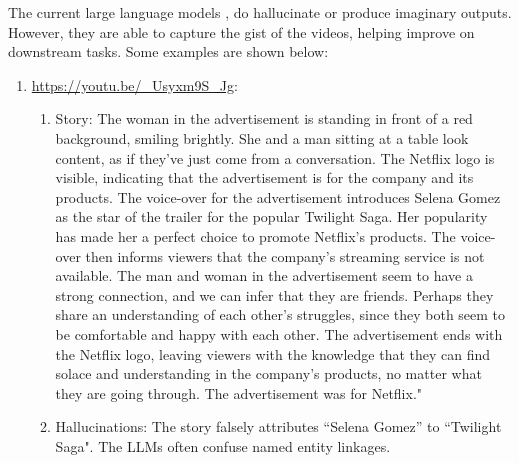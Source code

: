 \documentclass[hidelinks,11pt,a4paper]{report}
\begin{document}
The current large language models , do hallucinate or produce imaginary outputs. However, they are able to capture the gist of the videos, helping improve on downstream tasks. Some examples are shown below:

\begin{enumerate}
    \item \url{https://youtu.be/_Usyxm9S_Jg}:
    \begin{enumerate}
        \item Story: The woman in the advertisement is standing in front of a red background, smiling brightly. She and a man sitting at a table look content, as if they've just come from a conversation. The Netflix logo is visible, indicating that the advertisement is for the company and its products. The voice-over for the advertisement introduces Selena Gomez as the star of the trailer for the popular Twilight Saga. Her popularity has made her a perfect choice to promote Netflix's products. The voice-over then informs viewers that the company's streaming service is not available. The man and woman in the advertisement seem to have a strong connection, and we can infer that they are friends. Perhaps they share an understanding of each other's struggles, since they both seem to be comfortable and happy with each other. The advertisement ends with the Netflix logo, leaving viewers with the knowledge that they can find solace and understanding in the company's products, no matter what they are going through. The advertisement was for Netflix."

        \item Hallucinations: The story falsely attributes ``Selena Gomez'' to ``Twilight Saga". The LLMs often confuse named entity linkages.
    \end{enumerate}


\end{enumerate}
\end{document}
